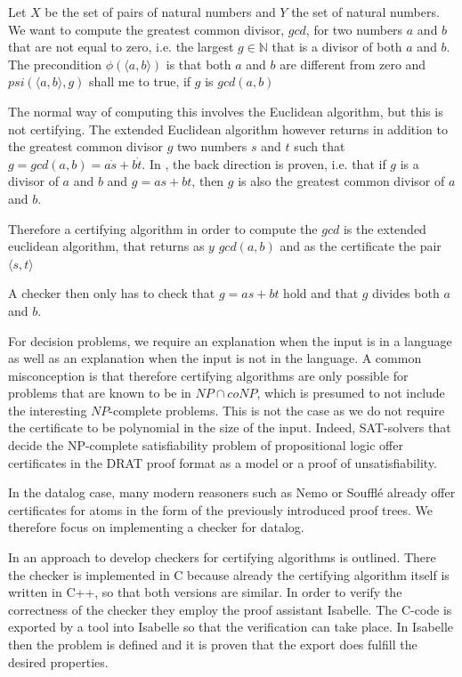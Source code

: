 \begin{example}
    Let $X$ be the set of pairs of natural numbers and $Y$ the set of natural numbers. We want to compute the greatest common divisor, $gcd$, for two numbers $a$ and $b$ that are not equal to zero, i.e. the largest $g \in \mathbb{N}$ that is a divisor of both $a$ and $b$. The precondition $\phi(\langle a, b\rangle)$ is that both $a$ and $b$ are different from zero and $psi(\langle a, b\rangle, g)$ shall me to true, if $g$ is $gcd(a,b)$

    The normal way of computing this involves the Euclidean algorithm, but this is not certifying. The extended Euclidean algorithm however returns in addition to the greatest common divisor $g$ two numbers $s$ and $t$ such that $g = gcd(a,b) = a \dot s + b \dot t$. In \cite{CertAlg}, the back direction is proven, i.e. that if $g$ is a divisor of $a$ and $b$ and $g = a s + b  t$, then $g$ is also the greatest common divisor of $a$ and $b$.

    Therefore a certifying algorithm in order to compute the $gcd$ is the extended euclidean algorithm, that returns as $y$ $gcd(a,b)$ and as the certificate the pair $\langle s, t\rangle$

    A checker then only has to check that $g=a s + b t$ hold and that $g$ divides both $a$ and $b$. 
\end{example}

For decision problems, we require an explanation when the input is in a language as well as an explanation when the input is not in the language. A common misconception is that therefore certifying algorithms are only possible for problems that are known to be in $NP \cap coNP$, which is presumed to not include the interesting $NP$-complete problems. This is not the case as we do not require the certificate to be polynomial in the size of the input. Indeed, SAT-solvers that decide the NP-complete satisfiability problem of propositional logic offer certificates in the DRAT proof format as a model or a proof of unsatisfiability\cite{DRAT}.

In the datalog case, many modern reasoners such as Nemo or Soufflé already offer certificates for atoms in the form of the previously introduced proof trees. We therefore focus on implementing a checker for datalog.

In \cite{CertCheckerWorkflow} an approach to develop checkers for certifying algorithms is outlined. There the checker is implemented in C because already the certifying algorithm itself is written in C++, so that both versions are similar. In order to verify the correctness of the checker they employ the proof assistant Isabelle. The C-code is exported by a tool into Isabelle so that the verification can take place. In Isabelle then the problem is defined and it is proven that the export does fulfill the desired properties. 

